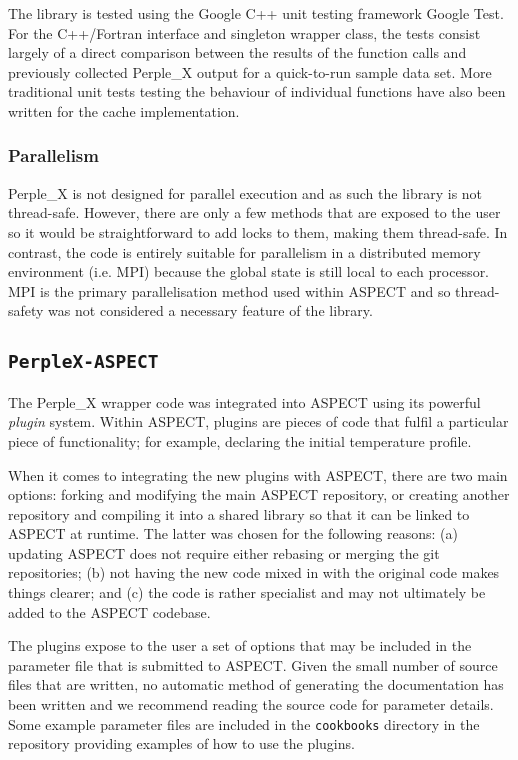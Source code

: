 The library is tested using the Google C++ unit testing framework Google Test.
For the C++/Fortran interface and singleton wrapper class, the tests consist largely of a direct comparison between the results of the function calls and previously collected Perple\_X output for a quick-to-run sample data set.
More traditional unit tests testing the behaviour of individual functions have also been written for the cache implementation.

\subsubsection{Parallelism}

Perple\_X is not designed for parallel execution and as such the library is not thread-safe. 
However, there are only a few methods that are exposed to the user so it would be straightforward to add locks to them, making them thread-safe.
In contrast, the code is entirely suitable for parallelism in a distributed memory environment (i.e. MPI) because the global state is still local to each processor.
MPI is the primary parallelisation method used within ASPECT and so thread-safety was not considered a necessary feature of the library.

\subsection{\texttt{PerpleX-ASPECT}}

The Perple\_X wrapper code was integrated into ASPECT using its powerful \textit{plugin} system.
Within ASPECT, plugins are pieces of code that fulfil a particular piece of functionality; for example, declaring the initial temperature profile.

When it comes to integrating the new plugins with ASPECT, there are two main options:
forking and modifying the main ASPECT repository, or creating another repository and compiling it into a shared library so that it can be linked to ASPECT at runtime.
The latter was chosen for the following reasons: 
(a) updating ASPECT does not require either rebasing or merging the git repositories;
(b) not having the new code mixed in with the original code makes things clearer; and 
(c) the code is rather specialist and may not ultimately be added to the ASPECT codebase.

The plugins expose to the user a set of options that may be included in the parameter file that is submitted to ASPECT.
Given the small number of source files that are written, no automatic method of generating the documentation has been written and we recommend reading the source code for \mbox{parameter} details. 
Some example parameter files are included in the \texttt{cookbooks} directory in the repository providing examples of how to use the plugins.

